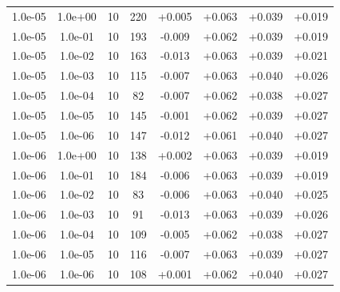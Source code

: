 \documentclass[11pt,a4paper]{article}
\begin{document}
\begin{table}
{\begin{tabular}{*{8}c}
 1.0e-05 	 & 1.0e+00 	 & 10 & 220 	 & +0.005 & +0.063 & +0.039 & +0.019 \\ 
 1.0e-05 	 & 1.0e-01 	 & 10 & 193 	 & -0.009 & +0.062 & +0.039 & +0.019 \\ 
 1.0e-05 	 & 1.0e-02 	 & 10 & 163 	 & -0.013 & +0.063 & +0.039 & +0.021 \\ 
 1.0e-05 	 & 1.0e-03 	 & 10 & 115 	 & -0.007 & +0.063 & +0.040 & +0.026 \\ 
 1.0e-05 	 & 1.0e-04 	 & 10 & 82 	 & -0.007 & +0.062 & +0.038 & +0.027 \\ 
 1.0e-05 	 & 1.0e-05 	 & 10 & 145 	 & -0.001 & +0.062 & +0.039 & +0.027 \\ 
 1.0e-05 	 & 1.0e-06 	 & 10 & 147 	 & -0.012 & +0.061 & +0.040 & +0.027 \\ 

 1.0e-06 	 & 1.0e+00 	 & 10 & 138 	 & +0.002 & +0.063 & +0.039 & +0.019 \\ 
 1.0e-06 	 & 1.0e-01 	 & 10 & 184 	 & -0.006 & +0.063 & +0.039 & +0.019 \\ 
 1.0e-06 	 & 1.0e-02 	 & 10 & 83 	 & -0.006 & +0.063 & +0.040 & +0.025 \\ 
 1.0e-06 	 & 1.0e-03 	 & 10 & 91 	 & -0.013 & +0.063 & +0.039 & +0.026 \\ 
 1.0e-06 	 & 1.0e-04 	 & 10 & 109 	 & -0.005 & +0.062 & +0.038 & +0.027 \\ 
 1.0e-06 	 & 1.0e-05 	 & 10 & 116 	 & -0.007 & +0.063 & +0.039 & +0.027 \\ 
 1.0e-06 	 & 1.0e-06 	 & 10 & 108 	 & +0.001 & +0.062 & +0.040 & +0.027 \\ 
\end{tabular}}
\label{Tab::4}
\end{table} 
\end{document}
